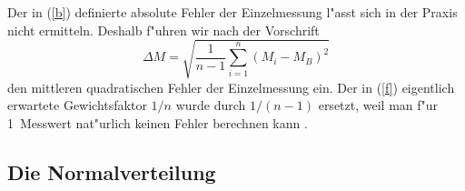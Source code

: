 Der in (\ref{b}) definierte absolute Fehler der
Einzelmessung l"asst sich in der
Praxis nicht ermitteln. Deshalb f"uhren wir nach der Vorschrift
%
\begin{equation} \label{f}
 \Delta M = \sqrt{
  \frac{1}{n-1} \sum_{i=1}^{n} \left( M_{i} - M_{B} \right)^{2}
 }
\end{equation}
%
den mittleren quadratischen Fehler der Einzelmessung ein. Der in
(\ref{f}) eigentlich erwartete Gewichtsfaktor $1/n$ wurde durch
$1/(n-1)$ ersetzt, weil man f"ur 1~Messwert nat"urlich keinen Fehler
berechnen kann \cite{beving,tbstat}.


\subsection{Die Normalverteilung}

